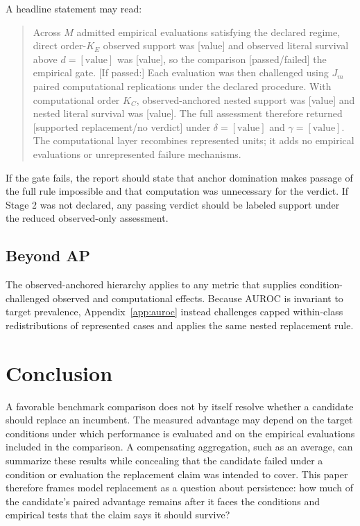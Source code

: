 \documentclass[11pt]{article}
\theoremstyle{remark}
\begin{document}
A headline statement may read:
\begin{quote}
Across $M$ admitted empirical evaluations satisfying the declared
regime, direct order-$K_E$ observed support was [value] and observed literal
survival above $d=[\text{value}]$ was [value], so the comparison
[passed/failed] the empirical gate. [If passed:] Each evaluation was then
challenged using $J_m$ paired computational replications under the declared
procedure. With computational order $K_C$, observed-anchored nested support was
[value] and nested literal survival was [value]. The full assessment therefore
returned [supported replacement/no verdict] under $\delta=[\text{value}]$ and
$\gamma=[\text{value}]$. The computational layer recombines represented units;
it adds no empirical evaluations or unrepresented failure mechanisms.
\end{quote}
If the gate fails, the report should state that anchor domination makes passage
of the full rule impossible and that computation was unnecessary for the
verdict. If Stage 2 was not declared, any passing verdict should be labeled
support under the reduced observed-only assessment.


\subsection{Beyond AP}

The observed-anchored hierarchy applies to any metric that supplies condition-challenged observed and computational effects. Because AUROC is invariant to target prevalence, Appendix~\ref{app:auroc} instead challenges capped within-class redistributions of represented cases and applies the same nested replacement rule.

\section{Conclusion}

A favorable benchmark comparison does not by itself resolve whether a
candidate should replace an incumbent. The measured advantage may depend on
the target conditions under which performance is evaluated and on the
empirical evaluations included in the comparison. A compensating aggregation,
such as an average, can summarize these results while concealing that the
candidate failed under a condition or evaluation the replacement claim was
intended to cover. This paper therefore frames model replacement as a question
about persistence: how much of the candidate's paired advantage remains after
it faces the conditions and empirical tests that the claim says it should
survive?
\end{document}
